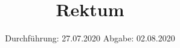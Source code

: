 

\subject{TPS Praktikum}
\title{Rektum}
\date{%
  Durchführung: 27.07.2020
  \hspace{3em}
  Abgabe: 02.08.2020
}



\maketitle
\thispagestyle{empty}
\tableofcontents
\newpage






\newpage

\printbibliography{}


